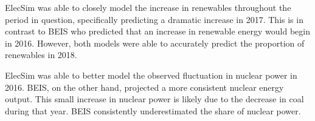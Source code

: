 ElecSim was able to closely model the increase in renewables throughout the period in question, specifically predicting a dramatic increase in 2017. This is in contrast to BEIS who predicted that an increase in renewable energy would begin in 2016. However, both models were able to accurately predict the proportion of renewables in 2018. 

ElecSim was able to better model the observed fluctuation in nuclear power in 2016. BEIS, on the other hand, projected a more consistent nuclear energy output. This small increase in nuclear power is likely due to the decrease in coal during that year. BEIS consistently underestimated the share of nuclear power. 









%


%




%


